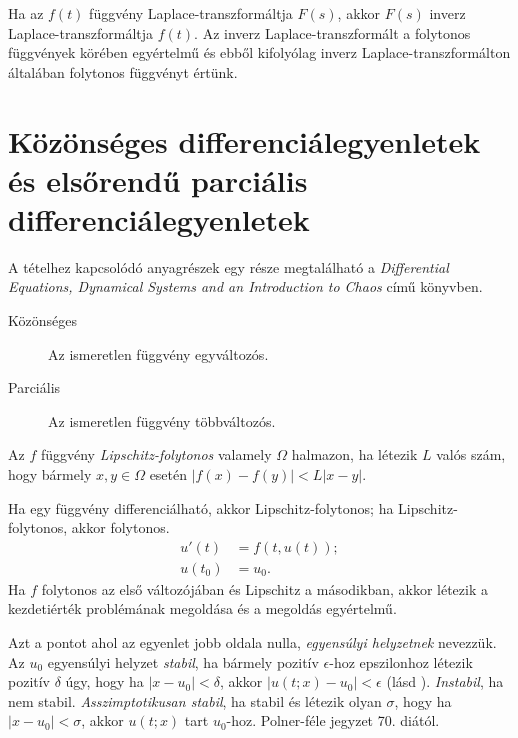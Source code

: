 \documentclass[DIV=15,appendixprefix]{scrreprt}
\theoremstyle{definition}
\theoremstyle{remark}
\begin{document}
Ha az $ f \left( t \right) $ függvény Laplace-transzformáltja $ F \left( s \right) $, akkor
$ F \left( s \right) $ inverz Laplace-transzformáltja $ f \left( t \right) $. Az inverz
Laplace-transzformált a folytonos függvények körében egyértelmű és ebből kifolyólag inverz
Laplace-transzformálton általában folytonos függvényt értünk.
%
\section{Közönséges differenciálegyenletek és elsőrendű parciális differenciálegyenletek}
A tételhez kapcsolódó anyagrészek egy része megtalálható a \emph{Differential Equations, Dynamical
Systems and an Introduction to Chaos} \cite{DE} című könyvben.
%
\begin{description}
	\item[Közönséges] Az ismeretlen függvény egyváltozós.
	\item[Parciális] Az ismeretlen függvény többváltozós.
\end{description}
Az $f$ függvény \emph{Lipschitz-folytonos} valamely $\Omega$ halmazon, ha létezik $L$ valós szám,
hogy bármely $ x,{} y \in \Omega $ esetén $ \left| f \left( x \right) - f \left( y \right) \right|
< L  \left| x - y \right|$.

Ha egy függvény differenciálható, akkor Lipschitz-folytonos; ha Lipschitz-folytonos, akkor
folytonos.
\begin{equation}\tag{KÉP}
	\begin{aligned}
		u' \left( t \right)  &= f \left( t,{} u \left( t \right)  \right);\\
		u \left( t_{ 0 } \right) &= u_0.
	\end{aligned}
\end{equation}
%
Ha $f$ folytonos az első változójában és Lipschitz a másodikban, akkor létezik a kezdetiérték
problémának megoldása és a megoldás egyértelmű.

Azt a pontot ahol az egyenlet jobb oldala nulla, \emph{egyensúlyi helyzetnek} nevezzük. Az $u_{ 0 }$
egyensúlyi helyzet \emph{stabil}, ha bármely pozitív $ \epsilon $-hoz epszilonhoz létezik pozitív
$ \delta $ úgy, hogy ha $ \left| x - u_{ 0 } \right| < \delta $, akkor $ \left| u \left( t;{} x
\right) - u_0 \right| < \epsilon $ (lásd \cite[175.~oldal]{DE}). \emph{Instabil}, ha nem stabil.
\emph{Asszimptotikusan stabil}, ha stabil és létezik olyan $\sigma$, hogy ha $\left| x - u_{ 0 }
\right| < \sigma$, akkor $u \left( t;{} x \right)$ tart $ u_{ 0 } $-hoz.
%
Polner-féle jegyzet 70. diától.
\end{document}

